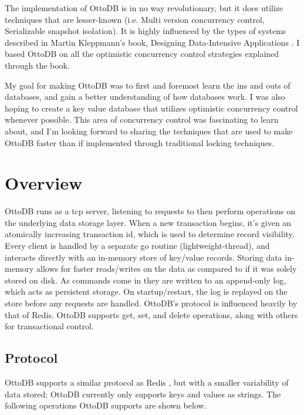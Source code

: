 \documentclass[conference]{IEEEtran}
\begin{document}
    The implementation of OttoDB is in no way revolutionary, but it does utilize techniques that are lesser-known (i.e. Multi version concurrency control, Serializable snapshot isolation). It is highly influenced by the types of systems described in Martin Kleppmann’s book, Designing Data-Intensive Applications \cite{b1}. I based OttoDB on all the optimistic concurrency control strategies explained through the book.
    
    My goal for making OttoDB was to first and foremost learn the ins and outs of databases, and gain a better understanding of how databases work. I was also hoping to create a key value database that utilizes optimistic concurrency control whenever possible. This area of concurrency control was fascinating to learn about, and I’m looking forward to sharing the techniques that are used to make OttoDB faster than if implemented through traditional locking techniques.

    \section{Overview}


    OttoDB runs as a tcp server, listening to requests to then perform operations on the underlying data storage layer. When a new transaction begins, it’s given an atomically increasing transaction id, which is used to determine record visibility. Every client is handled by a separate go routine (lightweight-thread), and interacts directly with an in-memory store of key/value records. Storing data in-memory allows for faster reads/writes on the data as compared to if it was solely stored on disk. As commands come in they are written to an append-only log, which acts as persistent storage. On startup/restart, the log is replayed on the store before any requests are handled. OttoDB’s protocol is influenced heavily by that of Redis. OttoDB supports get, set, and delete operations, along with others for transactional control.

    \subsection{Protocol}

    OttoDB supports a similar protocol as Redis \cite{b1}, but with a smaller variability of data stored; OttoDB currently only supports keys and values as strings. The following operations OttoDB supports are shown below.
\end{document}

